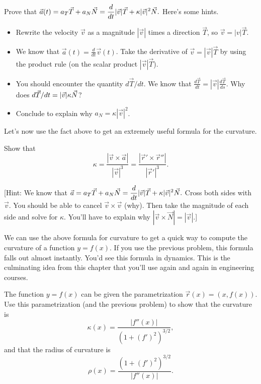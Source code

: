 \begin{problem}%
 Prove that $\displaystyle \vec a(t) = a_T\vec T+a_N\vec N=\frac{d}{dt}|\vec v| \vec T + \kappa |\vec v|^2 \vec N.$ Here's some hints.
\begin{itemize}
 \item Rewrite the velocity $\vec v$ as a magnitude $|\vec v|$ times a direction $\vec T$, so $\vec v = |v|\vec T$.  
 \item We know that $\vec a(t) = \frac{d}{dt}\vec v(t)$. Take the derivative of $\vec v = |\vec v|\vec T$ by using the product rule (on the scalar product $|\vec v|\vec T$).
 \item You should encounter the quantity $d\vec T/dt$. We know that $\frac{d\vec T}{dt} = |\vec v|\frac{d\vec T}{ds}$. Why does $\displaystyle d\vec T/dt=|\vec v|\kappa\vec N$?
 \item Conclude to explain why $a_N =\kappa |\vec v|^2$.
\end{itemize}
\end{problem}

Let's now use the fact above to get an extremely useful formula for the curvature. 

\begin{problem*}[Optional]
Show that $$\kappa = \frac{|\vec v\times \vec a|}{|\vec v|^3} = \frac{|\vec r'\times \vec r''|}{|\vec r'|^3}.$$

[Hint: We know that $\displaystyle \vec a = a_T\vec T+a_N\vec N=\frac{d}{dt}|\vec v| \vec T + \kappa |\vec v|^2 \vec N.$  
Cross both sides with $\vec v$. You should be able to cancel $\vec v\times \vec v$ (why). Then take the magnitude of each side and solve for $\kappa$. You'll have to explain why $|\vec v\times \vec N| = |\vec v|$.]
\end{problem*}

We can use the above formula for curvature to get a quick way to compute the curvature of a function $y=f(x)$. If you use the previous problem, this formula falls out almost instantly. You'd see this formula in dynamics. This is the culminating idea from this chapter that you'll use again and again in engineering courses.

\begin{problem*}[Optional]\label{formula for curvature}
%
 The function $y=f(x)$ can be given the parametrization  $\vec r(x) = (x,f(x))$.  Use this parametrization (and the previous problem) to show that the curvature is 
$$\kappa(x) = \frac{|f''(x)|}{(1+(f')^2)^{3/2}},$$ 
and that the radius of curvature is
$$\rho(x) = \frac{(1+(f')^2)^{3/2}}{|f''(x)|}.$$ 
\end{problem*}





